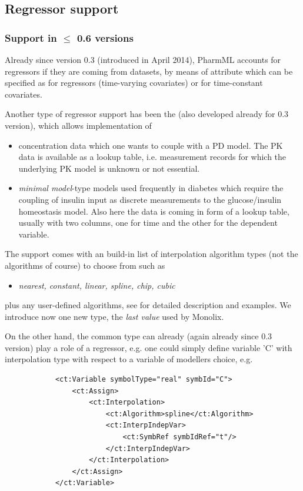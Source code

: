 \subsection{Regressor support}
\label{sec:regressors}

\subsubsection{Support in $\leq$ 0.6 versions}
Already since version 0.3 (introduced in April 2014), PharmML accounts for 
regressors if they are coming from datasets, by means of  attribute 
which can be specified as  for regressors (time-varying covariates) 
or  for time-constant covariates. 
 
Another type of regressor support has been the  (also developed 
already for 0.3 version), which allows implementation of
\begin{itemize}
\item 
concentration data which one wants to couple with a PD model. The PK data is 
available as a lookup table, i.e. measurement records for which the underlying 
PK model is unknown or not essential.
\item
\emph{minimal model}-type models used frequently in diabetes which require the coupling
of insulin input as discrete measurements to the glucose/insulin homeostasis model. 
Also here the data is coming in form of a lookup table, usually with two columns, one for 
time and the other for the dependent variable.
\end{itemize}
The support comes with an build-in list of interpolation algorithm types (not the algorithms 
of course) to choose from such as
\begin{itemize}
\item 
\emph{nearest, constant, linear, spline, chip, cubic}
\end{itemize}
plus any user-defined algorithms, see \cite{Swat:2014aa} for detailed description
and examples. We introduce now one new type, the \emph{last value} used by Monolix.


On the other hand, the common  type can already (again already since 
0.3 version) play a role of a regressor, e.g. one could simply define variable 'C'
with interpolation type with respect to a variable of modellers choice, e.g.
\lstset{language=XML}
\begin{lstlisting}
            <ct:Variable symbolType="real" symbId="C">
                <ct:Assign>
                    <ct:Interpolation>
                        <ct:Algorithm>spline</ct:Algorithm>
                        <ct:InterpIndepVar>
                            <ct:SymbRef symbIdRef="t"/>
                        </ct:InterpIndepVar>
                    </ct:Interpolation>
                </ct:Assign>
            </ct:Variable>
\end{lstlisting}

